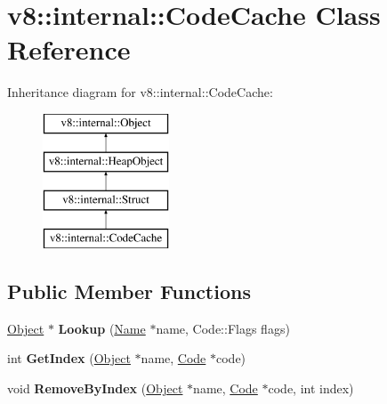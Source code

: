 \hypertarget{classv8_1_1internal_1_1_code_cache}{}\section{v8\+:\+:internal\+:\+:Code\+Cache Class Reference}
\label{classv8_1_1internal_1_1_code_cache}
Inheritance diagram for v8\+:\+:internal\+:\+:Code\+Cache\+:\begin{figure}[H]
\begin{center}
\leavevmode
\includegraphics[height=4.000000cm]{classv8_1_1internal_1_1_code_cache}
\end{center}
\end{figure}
\subsection*{Public Member Functions}
\begin{DoxyCompactItemize}
\item 
\hypertarget{classv8_1_1internal_1_1_code_cache_a2556398e3b2d679d2425456e772b115a}{}\hyperlink{classv8_1_1internal_1_1_object}{Object} $\ast$ {\bfseries Lookup} (\hyperlink{classv8_1_1internal_1_1_name}{Name} $\ast$name, Code\+::\+Flags flags)\label{classv8_1_1internal_1_1_code_cache_a2556398e3b2d679d2425456e772b115a}

\item 
\hypertarget{classv8_1_1internal_1_1_code_cache_a957581909501e59540d95104753f615e}{}int {\bfseries Get\+Index} (\hyperlink{classv8_1_1internal_1_1_object}{Object} $\ast$name, \hyperlink{classv8_1_1internal_1_1_code}{Code} $\ast$code)\label{classv8_1_1internal_1_1_code_cache_a957581909501e59540d95104753f615e}

\item 
\hypertarget{classv8_1_1internal_1_1_code_cache_ac677eaf3af2863990a66d7c55c9c4cf0}{}void {\bfseries Remove\+By\+Index} (\hyperlink{classv8_1_1internal_1_1_object}{Object} $\ast$name, \hyperlink{classv8_1_1internal_1_1_code}{Code} $\ast$code, int index)\label{classv8_1_1internal_1_1_code_cache_ac677eaf3af2863990a66d7c55c9c4cf0}

\end{DoxyCompactItemize}
